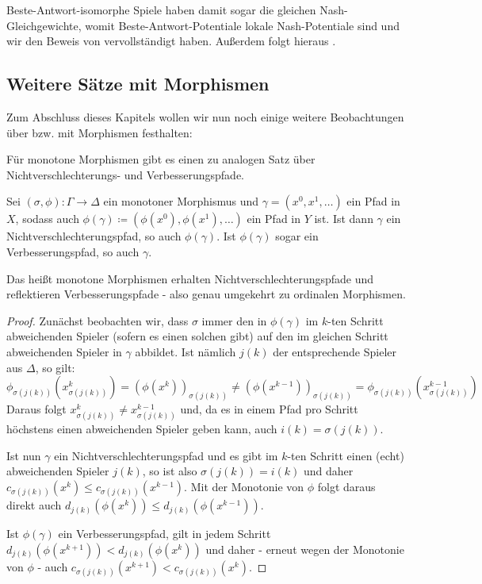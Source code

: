 Beste-Antwort-isomorphe Spiele haben damit sogar die gleichen Nash-Gleichgewichte, womit Beste-Antwort-Potentiale lokale Nash-Potentiale sind und wir den Beweis von  vervollständigt haben. Außerdem folgt hieraus .


\subsection{Weitere Sätze mit Morphismen}

Zum Abschluss dieses Kapitels wollen wir nun noch einige weitere Beobachtungen über bzw. mit Morphismen festhalten:

Für monotone Morphismen gibt es einen zu  analogen Satz über Nichtverschlechterungs- und Verbesserungspfade.

\begin{prop}
	Sei $(\sigma, \phi): \Gamma \to \Delta$ ein monotoner Morphismus und $\gamma = (x^0, x^1, \dots)$ ein Pfad in $X$, sodass auch $\phi(\gamma) \coloneqq (\phi(x^0), \phi(x^1), \dots)$ ein Pfad in $Y$ ist. Ist dann $\gamma$ ein Nichtverschlechterungspfad, so auch $\phi(\gamma)$. Ist $\phi(\gamma)$ sogar ein Verbesserungspfad, so auch $\gamma$.
\end{prop}

Das heißt monotone Morphismen erhalten Nichtverschlechterungspfade und reflektieren Verbesserungspfade - also genau umgekehrt zu ordinalen Morphismen.

\begin{proof}
	Zunächst beobachten wir, dass $\sigma$ immer den in $\phi(\gamma)$ im $k$-ten Schritt abweichenden Spieler (sofern es einen solchen gibt) auf den im gleichen Schritt abweichenden Spieler in $\gamma$ abbildet. Ist nämlich $j(k)$ der entsprechende Spieler aus $\Delta$, so gilt:
	\[\phi_{\sigma(j(k))}\left(x_{\sigma(j(k))}^k\right) = \left(\phi(x^k)\right)_{\sigma(j(k))} \neq \left(\phi(x^{k-1})\right)_{\sigma(j(k))} = \phi_{\sigma(j(k))}\left(x_{\sigma(j(k))}^{k-1}\right)\]
	Daraus folgt $x_{\sigma(j(k))}^k \neq x_{\sigma(j(k))}^{k-1}$ und, da es in einem Pfad pro Schritt höchstens einen abweichenden Spieler geben kann, auch $i(k) = \sigma(j(k))$.
	
	Ist nun $\gamma$ ein Nichtverschlechterungspfad und es gibt im $k$-ten Schritt einen (echt) abweichenden Spieler $j(k)$, so ist also $\sigma(j(k)) = i(k)$ und daher $c_{\sigma(j(k))}(x^k) \leq c_{\sigma(j(k))}(x^{k-1})$. Mit der Monotonie von $\phi$ folgt daraus direkt auch $d_{j(k)}(\phi(x^k)) \leq d_{j(k)}(\phi(x^{k-1}))$.
	
	Ist $\phi(\gamma)$ ein Verbesserungspfad, gilt in jedem Schritt $d_{j(k)}(\phi(x^{k+1})) < d_{j(k)}(\phi(x^k))$ und daher - erneut wegen der Monotonie von $\phi$ - auch $c_{\sigma(j(k))}(x^{k+1}) < c_{\sigma(j(k))}(x^{k})$.
\end{proof}

